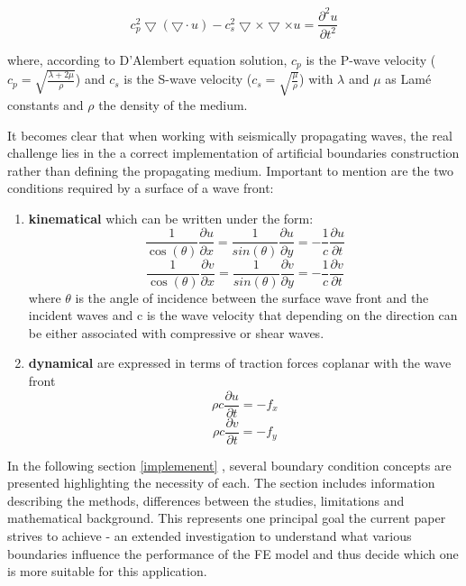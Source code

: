 \documentclass[10pt,a4paper]{report}
\begin{document}
\begin{equation}
c_p^2\bigtriangledown(\bigtriangledown\cdot u) - c_s^2\bigtriangledown \times \bigtriangledown \times u = \frac{\partial^2 u}{\partial t^2}
\end{equation} 

where, according to D'Alembert equation solution, $c_p$ is the P-wave velocity ($c_p=\sqrt{\frac{\lambda + 2 \mu}{\rho}}$) and $c_s$ is the S-wave velocity ($c_s=\sqrt{\frac{\mu}{\rho}}$) with $\lambda$ and $\mu$ as Lamé constants and $\rho$ the density of the medium.

It becomes clear that when working with seismically propagating waves, the real challenge lies in the a correct implementation of artificial boundaries construction rather than defining the propagating medium. Important to mention are the two conditions required by a surface of a wave front:
\begin{enumerate}
	\item \textbf{kinematical} which can be written under the form:
	\begin{equation}
		\frac{1}{\cos(\theta)}\frac{\partial u}{\partial x}= \frac{1}{sin(\theta)}\frac{\partial u}{\partial y} = - \frac{1}{c}\frac{\partial u}{\partial t}
	\end{equation}
		\begin{equation}
		\frac{1}{\cos(\theta)}\frac{\partial v}{\partial x}= \frac{1}{sin(\theta)}\frac{\partial v}{\partial y} = - \frac{1}{c}\frac{\partial v}{\partial t}
	\end{equation}
	 where $\theta$ is the angle of incidence between the surface wave front and the incident waves and c is the wave velocity that depending on the direction can be either associated with compressive or shear waves.
	\item \textbf{dynamical} are expressed in terms of traction forces coplanar with the wave front
	\begin{equation}
		\rho c \frac{\partial u}{\partial t}= - f_x
	\end{equation}
		\begin{equation}
		\rho c \frac{\partial v}{\partial t}= - f_y
		\end{equation}
\end{enumerate} 

In the following section \ref{implemenent} , several boundary condition concepts are presented highlighting the necessity of each. The section includes information describing the methods, differences between the studies, limitations and mathematical background. This represents one principal goal the current paper strives to achieve - an extended investigation to understand what various boundaries influence the performance of the FE model and thus decide which one is more suitable for this application.
\end{document}
